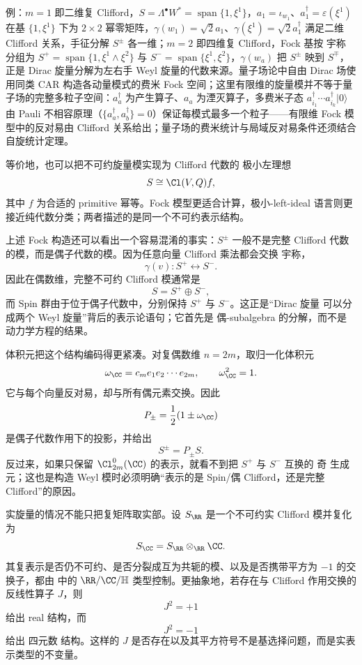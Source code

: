 例：$m=1$ 即二维复 Clifford，$S=\Lambda^\bullet W^*=\operatorname{span}\{1,\xi^1\}$，$a_1=\iota_{w_1}$、$a_1^\dagger=\varepsilon(\xi^1)$ 在基 $\{1,\xi^1\}$ 下为 $2\times2$ 幂零矩阵，$\gamma(w_1)=\sqrt2a_1$、$\gamma(\xi^1)=\sqrt2a_1^\dagger$ 满足二维 Clifford 关系，手征分解 $S^\pm$ 各一维；$m=2$ 即四维复 Clifford，Fock 基按 宇称 分组为 $S^+=\operatorname{span}\{1,\xi^1\wedge\xi^2\}$ 与 $S^-=\operatorname{span}\{\xi^1,\xi^2\}$，$\gamma(w_a)$ 把 $S^\pm$ 映到 $S^\mp$，正是 Dirac 旋量分解为左右手 Weyl 旋量的代数来源。量子场论中自由 Dirac 场使用同类 CAR 构造各动量模式的费米 Fock 空间；这里有限维的旋量模并不等于量子场的完整多粒子空间：$a_a^\dagger$ 为产生算子、$a_a$ 为湮灭算子，多费米子态 $a_{i_1}^\dagger\cdots a_{i_k}^\dagger|0\rangle$ 由 Pauli 不相容原理（$\{a_a^\dagger,a_b^\dagger\}=0$）保证每模式最多一个粒子——有限维 Fock 模型中的反对易由 Clifford 关系给出；量子场的费米统计与局域反对易条件还须结合自旋统计定理。

等价地，也可以把不可约旋量模实现为 Clifford 代数的 极小左理想
\[
S\cong\Cl(V,Q)f,
\]
其中 $f$ 为合适的 primitive 幂等。Fock 模型更适合计算，极小-left-ideal 语言则更接近纯代数分类；两者描述的是同一个不可约表示结构。

上述 Fock 构造还可以看出一个容易混淆的事实：$S^\pm$ 一般不是完整 Clifford 代数的模，而是偶子代数的模。因为任意向量 Clifford 乘法都会交换 宇称，
\[
\gamma(v):S^+\leftrightarrow S^-.
\]
因此在偶数维，完整不可约 Clifford 模通常是
\[
S=S^+\oplus S^-,
\]
而 Spin 群由于位于偶子代数中，分别保持 $S^+$ 与 $S^-$。这正是“Dirac 旋量 可以分成两个 Weyl 旋量”背后的表示论语句；它首先是 偶-subalgebra 的分解，而不是动力学方程的结果。

体积元把这个结构编码得更紧凑。对复偶数维 $n=2m$，取归一化体积元
\[
\omega_{\CC}=c_m e_1e_2\cdots e_{2m},
\qquad
\omega_{\CC}^2=1.
\]
它与每个向量反对易，却与所有偶元素交换。因此
\[
P_\pm=\frac12(1\pm\omega_{\CC})
\]
是偶子代数作用下的投影，并给出
\[
S^\pm=P_\pm S.
\]
反过来，如果只保留 $\Cl_{2m}^0(\CC)$ 的表示，就看不到把 $S^+$ 与 $S^-$ 互换的 奇 生成元；这也是构造 Weyl 模时必须明确“表示的是 Spin/偶 Clifford，还是完整 Clifford”的原因。

实旋量的情况不能只把复矩阵取实部。设 $S_\RR$ 是一个不可约实 Clifford 模并复化为
\[
S_\CC=S_\RR\otimes_\RR\CC.
\]
其复表示是否仍不可约、是否分裂成互为共轭的模、以及是否携带平方为 $-1$ 的交换子，都由 中的 $\RR/\CC/\mathbb H$ 类型控制。更抽象地，若存在与 Clifford 作用交换的反线性算子 $J$，则
\[
J^2=+1
\]
给出 real 结构，而
\[
J^2=-1
\]
给出 四元数 结构。这样的 $J$ 是否存在以及其平方符号不是基选择问题，而是实表示类型的不变量。

